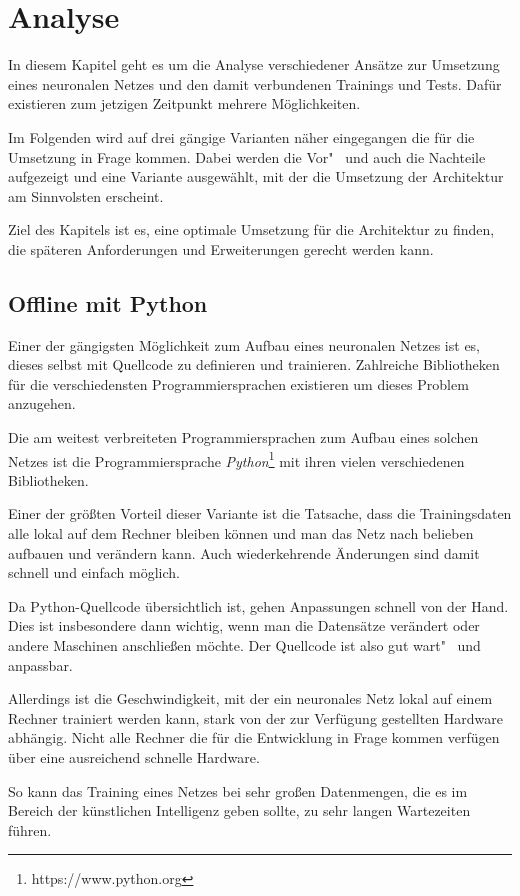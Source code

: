 \section{Analyse}
\label{sec:analyse}
In diesem Kapitel geht es um die Analyse verschiedener Ansätze zur Umsetzung eines neuronalen Netzes und den damit
verbundenen Trainings und Tests. Dafür existieren zum jetzigen Zeitpunkt mehrere Möglichkeiten.

Im Folgenden wird auf drei gängige Varianten näher eingegangen die für die Umsetzung in Frage kommen. Dabei werden die
Vor"~ und auch die Nachteile aufgezeigt und eine Variante ausgewählt, mit der die Umsetzung der Architektur am
Sinnvolsten erscheint.

Ziel des Kapitels ist es, eine optimale Umsetzung für die Architektur zu finden, die späteren Anforderungen und
Erweiterungen gerecht werden kann.

\subsection{Offline mit Python}
Einer der gängigsten Möglichkeit zum Aufbau eines neuronalen Netzes ist es, dieses selbst mit Quellcode zu definieren
und trainieren. Zahlreiche Bibliotheken für die verschiedensten Programmiersprachen existieren um dieses Problem
anzugehen.

Die am weitest verbreiteten Programmiersprachen zum Aufbau eines solchen Netzes ist die Programmiersprache
\textit{Python}\footnote{https://www.python.org} mit ihren vielen verschiedenen Bibliotheken.

Einer der größten Vorteil dieser Variante ist die Tatsache, dass die Trainingsdaten alle lokal auf dem Rechner bleiben
können und man das Netz nach belieben aufbauen und verändern kann. Auch wiederkehrende Änderungen sind damit schnell und
einfach möglich.

Da Python-Quellcode übersichtlich ist, gehen Anpassungen schnell von der Hand. Dies ist insbesondere dann wichtig, wenn
man die Datensätze verändert oder andere Maschinen anschließen möchte. Der Quellcode ist also gut wart"~ und anpassbar.

Allerdings ist die Geschwindigkeit, mit der ein neuronales Netz lokal auf einem Rechner trainiert werden kann, stark
von der zur Verfügung gestellten Hardware abhängig. Nicht alle Rechner die für die Entwicklung in Frage kommen verfügen
über eine ausreichend schnelle Hardware.

So kann das Training eines Netzes bei sehr großen Datenmengen, die es im Bereich der künstlichen Intelligenz geben
sollte, zu sehr langen Wartezeiten führen.


